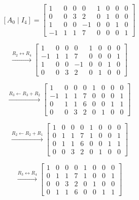 
\begin{answer}
    $$
    [A_0\mid I_4]=
    \left[
    \begin{array}{cccc|cccc}
         1 & 0 & 0 & 0 & 1 & 0 & 0 & 0\\
         0 & 0 & 3 & 2 & 0 & 1 & 0 & 0\\
         1 & 0 & 0 & -1 & 0 & 0 & 1 & 0\\
        -1 & 1 & 1 & 7 & 0 & 0 & 0 & 1
    \end{array}
    \right]
    $$

    $$
    \xrightarrow{R_2\leftrightarrow R_4}
    \left[
    \begin{array}{cccc|cccc}
         1 & 0 & 0 & 0 & 1 & 0 & 0 & 0\\
        -1 & 1 & 1 & 7 & 0 & 0 & 0 & 1\\
         1 & 0 & 0 & -1 & 0 & 0 & 1 & 0\\
         0 & 0 & 3 & 2 & 0 & 1 & 0 & 0
    \end{array}
    \right]
    $$

    $$
    \xrightarrow{R_3\leftarrow R_3+R_2}
    \left[
    \begin{array}{cccc|cccc}
         1 & 0 & 0 & 0 & 1 & 0 & 0 & 0\\
        -1 & 1 & 1 & 7 & 0 & 0 & 0 & 1\\
         0 & 1 & 1 & 6 & 0 & 0 & 1 & 1\\
         0 & 0 & 3 & 2 & 0 & 1 & 0 & 0
    \end{array}
    \right]
    $$

    $$
    \xrightarrow{R_2\leftarrow R_2+R_1}
    \left[
    \begin{array}{cccc|cccc}
        1 & 0 & 0 & 0 & 1 & 0 & 0 & 0\\
        0 & 1 & 1 & 7 & 1 & 0 & 0 & 1\\
        0 & 1 & 1 & 6 & 0 & 0 & 1 & 1\\
        0 & 0 & 3 & 2 & 0 & 1 & 0 & 0
    \end{array}
    \right]
    $$

    $$
    \xrightarrow{R_3\leftrightarrow R_4}
    \left[
    \begin{array}{cccc|cccc}
        1 & 0 & 0 & 0 & 1 & 0 & 0 & 0\\
        0 & 1 & 1 & 7 & 1 & 0 & 0 & 1\\
        0 & 0 & 3 & 2 & 0 & 1 & 0 & 0\\
        0 & 1 & 1 & 6 & 0 & 0 & 1 & 1
    \end{array}
    \right]
    $$


\end{answer}
